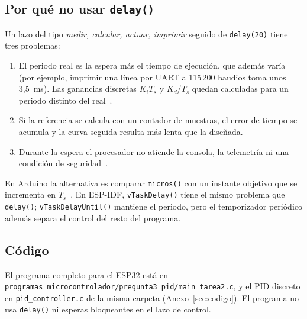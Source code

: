 \subsection{Por qué no usar \texttt{delay()}}
Un lazo del tipo \emph{medir, calcular, actuar, imprimir} seguido de \texttt{delay(20)} tiene tres
problemas:
\begin{enumerate}
  \item El periodo real es la espera más el tiempo de ejecución, que además varía (por ejemplo,
  imprimir una línea por UART a 115\,200 baudios toma unos 3,5~ms). Las ganancias discretas
  $K_iT_s$ y $K_d/T_s$ quedan calculadas para un periodo distinto del real~\cite{astrom1997computer}.
  \item Si la referencia se calcula con un contador de muestras, el error de tiempo se acumula y la
  curva seguida resulta más lenta que la diseñada.
  \item Durante la espera el procesador no atiende la consola, la telemetría ni una condición de
  seguridad~\cite{arduinoblink}.
\end{enumerate}
En Arduino la alternativa es comparar \texttt{micros()} con un instante objetivo que se incrementa
en $T_s$~\cite{arduinoblink}. En ESP-IDF, \texttt{vTaskDelay()} tiene el mismo problema que
\texttt{delay()}; \texttt{vTaskDelayUntil()} mantiene el periodo, pero el temporizador periódico
además separa el control del resto del programa.

\subsection{Código}
El programa completo para el ESP32 está en
\texttt{programas\_microcontrolador/pregunta3\_pid/main\_tarea2.c}, y el PID discreto en
\texttt{pid\_controller.c} de la misma carpeta (Anexo~\ref{sec:codigo}). El programa no usa
\texttt{delay()} ni esperas bloqueantes en el lazo de control.
